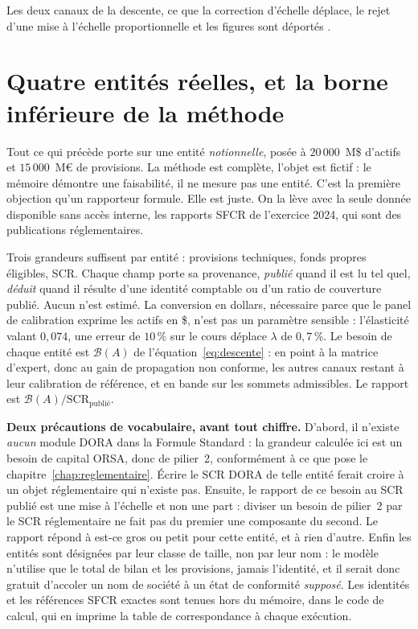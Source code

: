 Les deux canaux de la descente, ce que la correction d'échelle déplace, le rejet d'une mise à
l'échelle proportionnelle et les figures sont déportés \matcomp.

\section{Quatre entités réelles, et la borne inférieure de la méthode}
\label{sec:entites-reelles}

Tout ce qui précède porte sur une entité \emph{notionnelle}, posée à $20\,000$~M\$ d'actifs et
$15\,000$~M\euro{} de provisions. La méthode est complète, l'objet est fictif : le mémoire
démontre une faisabilité, il ne mesure pas une entité. C'est la première objection qu'un
rapporteur formule. Elle est juste. On la lève avec la seule donnée disponible sans accès
interne, les rapports SFCR de l'exercice 2024, qui sont des publications
réglementaires.

Trois grandeurs suffisent par entité : provisions techniques, fonds propres éligibles,
SCR. Chaque champ porte sa provenance, \emph{publié} quand il est lu tel quel,
\emph{déduit} quand il résulte d'une identité comptable ou d'un ratio de couverture publié.
Aucun n'est estimé. La conversion en dollars, nécessaire parce que le panel de calibration
exprime les actifs en \$, n'est pas un paramètre sensible : l'élasticité valant $0{,}074$, une
erreur de $10\,\%$ sur le cours déplace $\lambda$ de $0{,}7\,\%$. Le besoin de chaque entité est
$\mathcal{B}(A)$ de l'équation~\eqref{eq:descente} : en point à la matrice d'expert, donc au gain
de propagation non conforme, les autres canaux restant à leur calibration de référence, et en
bande sur les sommets admissibles. Le rapport est $\mathcal{B}(A)/\mathrm{SCR}_{\text{publié}}$.

\begin{attention}
\textbf{Deux précautions de vocabulaire, avant tout chiffre.} D'abord, il n'existe \emph{aucun}
module DORA dans la Formule Standard : la grandeur calculée ici est un besoin de
capital ORSA, donc de pilier~2, conformément à ce que pose le
chapitre~\ref{chap:reglementaire}. Écrire \og le SCR DORA de telle entité\fg{} ferait
croire à un objet réglementaire qui n'existe pas. Ensuite, le rapport de ce besoin au SCR
publié est une mise à l'échelle et non une part : diviser un besoin de pilier~2 par le
SCR réglementaire ne fait pas du premier une composante du second. Le rapport répond à
\og est-ce gros ou petit pour cette entité\fg{}, et à rien d'autre. Enfin les entités sont désignées
par leur classe de taille, non par leur nom : le modèle n'utilise que le total de bilan et les
provisions, jamais l'identité, et il serait donc gratuit d'accoler un nom de société à un état de
conformité \emph{supposé}. Les identités et les références SFCR exactes sont tenues hors
du mémoire, dans le code de calcul, qui en imprime la table de correspondance à chaque exécution.
\end{attention}

